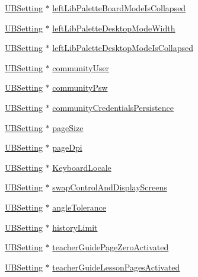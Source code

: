 \begin{DoxyCompactItemize}
\hyperlink{class_u_b_setting}{U\-B\-Setting} $\ast$ \hyperlink{class_u_b_settings_aeb42e33f2607503868c84c3d98e4c02c}{left\-Lib\-Palette\-Board\-Mode\-Is\-Collapsed}
\item 
\hyperlink{class_u_b_setting}{U\-B\-Setting} $\ast$ \hyperlink{class_u_b_settings_a956d853b5bc1decb27572fb1b92681fd}{left\-Lib\-Palette\-Desktop\-Mode\-Width}
\item 
\hyperlink{class_u_b_setting}{U\-B\-Setting} $\ast$ \hyperlink{class_u_b_settings_a048c958d7f12527c6f1d4017cb6fb5a6}{left\-Lib\-Palette\-Desktop\-Mode\-Is\-Collapsed}
\item 
\hyperlink{class_u_b_setting}{U\-B\-Setting} $\ast$ \hyperlink{class_u_b_settings_ae56024b1544199d1e60fe5a7b00e04fa}{community\-User}
\item 
\hyperlink{class_u_b_setting}{U\-B\-Setting} $\ast$ \hyperlink{class_u_b_settings_a23ae0e9782365ef8baeff3618292ceb5}{community\-Psw}
\item 
\hyperlink{class_u_b_setting}{U\-B\-Setting} $\ast$ \hyperlink{class_u_b_settings_a28cdd1c327f6b9f8228b0e76a24de0d8}{community\-Credentials\-Persistence}
\item 
\hyperlink{class_u_b_setting}{U\-B\-Setting} $\ast$ \hyperlink{class_u_b_settings_a0bb5fa51820495ec8eae651b5a4e1b7c}{page\-Size}
\item 
\hyperlink{class_u_b_setting}{U\-B\-Setting} $\ast$ \hyperlink{class_u_b_settings_a9da52a4a55207f616c01ec65be66e635}{page\-Dpi}
\item 
\hyperlink{class_u_b_setting}{U\-B\-Setting} $\ast$ \hyperlink{class_u_b_settings_af8fe40526842d1417407512372516df3}{Keyboard\-Locale}
\item 
\hyperlink{class_u_b_setting}{U\-B\-Setting} $\ast$ \hyperlink{class_u_b_settings_a677486ca02da069640c8db3c2f9b1593}{swap\-Control\-And\-Display\-Screens}
\item 
\hyperlink{class_u_b_setting}{U\-B\-Setting} $\ast$ \hyperlink{class_u_b_settings_a52ee8c0d35d5d7f767c00f27382c97e3}{angle\-Tolerance}
\item 
\hyperlink{class_u_b_setting}{U\-B\-Setting} $\ast$ \hyperlink{class_u_b_settings_a7611712c43c9117dc809ba0a9cd4488f}{history\-Limit}
\item 
\hyperlink{class_u_b_setting}{U\-B\-Setting} $\ast$ \hyperlink{class_u_b_settings_ac19853b7eb0ebe29c2f6146a8b92d031}{teacher\-Guide\-Page\-Zero\-Activated}
\item 
\hyperlink{class_u_b_setting}{U\-B\-Setting} $\ast$ \hyperlink{class_u_b_settings_aa80b727473c0beb0534b3aa274582408}{teacher\-Guide\-Lesson\-Pages\-Activated}

\end{DoxyCompactItemize}
